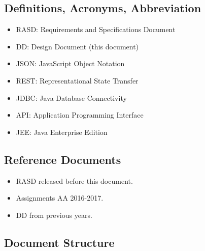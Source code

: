 \subsection{Definitions, Acronyms, Abbreviation}
\begin{itemize}
\item RASD: Requirements and Specifications Document
\item DD: Design Document (this document)
\item JSON: JavaScript Object Notation
\item REST: Representational State Transfer
\item JDBC: Java Database Connectivity
\item API: Application Programming Interface
\item JEE: Java Enterprise Edition
\end{itemize}

\subsection{Reference Documents}
\begin{itemize}
\item RASD released before this document.
\item Assignments AA 2016-2017.
\item DD from previous years.
\end{itemize}

\subsection{Document Structure}


